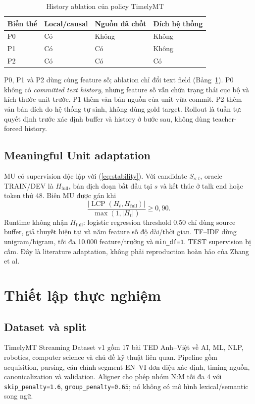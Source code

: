\documentclass[conference]{IEEEtran}
\newcommand{\lcp}{\operatorname{LCP}}
\begin{document}
\begin{table}[t]
\caption{History ablation của policy TimelyMT}
\label{tab:ablation}
\centering
\scriptsize
\begin{tabular}{p{}p{}p{}p{}}
\toprule
Biến thể & Local/causal & Nguồn đã chốt & Đích hệ thống \\
\midrule
P0 & Có & Không & Không \\
P1 & Có & Có & Không \\
P2 & Có & Có & Có \\
\bottomrule
\end{tabular}
\end{table}

P0, P1 và P2 dùng cùng feature số; ablation chỉ đổi text field (Bảng~\ref{tab:ablation}). P0 không có \emph{committed text history}, nhưng feature số vẫn chứa trạng thái cục bộ và kích thước unit trước. P1 thêm văn bản nguồn của unit vừa commit. P2 thêm văn bản đích do hệ thống tự sinh, không dùng gold target. Rollout là tuần tự: quyết định trước xác định buffer và history ở bước sau, không dùng teacher-forced history.

\subsection{Meaningful Unit adaptation}
MU có supervision độc lập với (\ref{eq:stability}). Với candidate $S_{s:t}$, oracle TRAIN/DEV là $H_{\mathrm{full}}$, bản dịch đoạn bắt đầu tại $s$ và kết thúc ở talk end hoặc token thứ 48. Biên MU được gán khi
\begin{equation}
\frac{|\lcp(H_t,H_{\mathrm{full}})|}{\max(1,|H_t|)}\geq0{,}90.
\end{equation}
Runtime không nhận $H_{\mathrm{full}}$: logistic regression threshold 0,50 chỉ dùng source buffer, giả thuyết hiện tại và năm feature số độ dài/thời gian. TF--IDF dùng unigram/bigram, tối đa 10.000 feature/trường và \texttt{min\_df=1}. TEST supervision bị cấm. Đây là literature adaptation, không phải reproduction hoàn hảo của Zhang et al.

\section{Thiết lập thực nghiệm}
\subsection{Dataset và split}
TimelyMT Streaming Dataset v1 gồm 17 bài TED Anh--Việt về AI, ML, NLP, robotics, computer science và chủ đề kỹ thuật liên quan. Pipeline gồm acquisition, parsing, căn chỉnh segment EN--VI đơn điệu xác định, timing nguồn, canonicalization và validation. Aligner cho phép nhóm N:M tối đa 4 với \texttt{skip\_penalty=1.6}, \texttt{group\_penalty=0.65}; nó không có mô hình lexical/semantic song ngữ.
\end{document}
